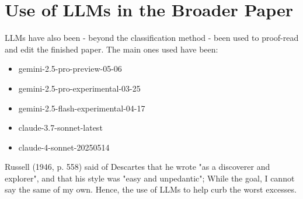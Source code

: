 \section{Use of LLMs in the Broader Paper}

LLMs have also been - beyond the classification method - been used to proof-read and edit the finished paper. The main ones used have been:

\begin{itemize}
    \item gemini-2.5-pro-preview-05-06
    \item gemini-2.5-pro-experimental-03-25
    \item gemini-2.5-flash-experimental-04-17
    \item claude-3.7-sonnet-latest
    \item claude-4-sonnet-20250514
\end{itemize}

Russell (1946, p. 558) said of Descartes that he wrote "as a discoverer and explorer", and that his style was "easy and unpedantic"; While the goal, I cannot say the same of my own. Hence, the use of LLMs to help curb the worst excesses. 

